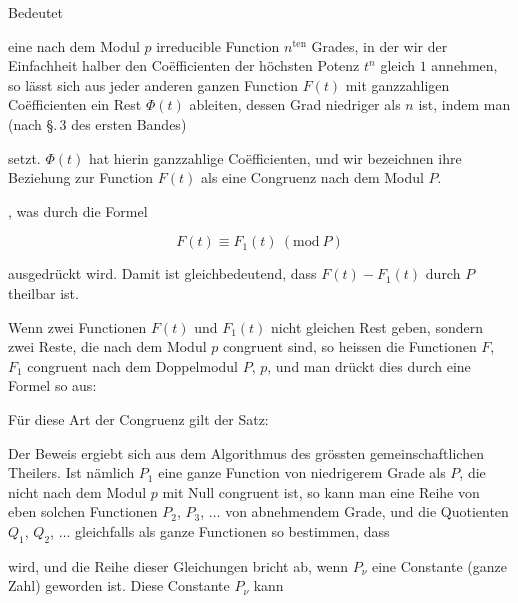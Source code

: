 Bedeutet


eine nach dem Modul $p$ irreducible Function $n^{\mathrm{ten}}$ Grades, in der wir der Einfachheit halber den Co\"efficienten der höchsten Potenz $t^n$ gleich $1$ annehmen, so lässt sich aus jeder anderen ganzen Function $F(t)$ mit ganzzahligen Co\"efficienten ein Rest $\Phi(t)$ ableiten, dessen Grad niedriger als $n$ ist, indem man (nach \S.\,3 des ersten Bandes)


setzt. $\Phi(t)$ hat hierin ganzzahlige Co\"efficienten, und wir bezeichnen ihre Beziehung zur Function $F(t)$ als eine Congruenz nach dem Modul $P$.

, was durch die Formel

\[
F(t) \equiv F_1(t)\ (\mathrm{mod}\ P)
\]

ausgedrückt wird. Damit ist gleichbedeutend, dass $F(t) - F_1(t)$ durch $P$ theilbar ist.

Wenn zwei Functionen $F(t)$ und $F_1(t)$ nicht gleichen Rest geben, sondern zwei Reste, die nach dem Modul $p$ congruent sind, so heissen die Functionen $F$, $F_1$ congruent nach dem Doppelmodul $P$, $p$, und man drückt dies durch eine Formel so aus:


Für diese Art der Congruenz gilt der Satz:


Der Beweis ergiebt sich aus dem Algorithmus des grössten gemeinschaftlichen Theilers. Ist nämlich $P_1$ eine ganze Function von niedrigerem Grade als $P$, die nicht nach dem Modul $p$ mit Null congruent ist, so kann man eine Reihe von eben solchen Functionen $P_2$, $P_3$, $\ldots$ von abnehmendem Grade, und die Quotienten $Q_1$, $Q_2$, $\ldots$ gleichfalls als ganze Functionen so bestimmen, dass


wird, und die Reihe dieser Gleichungen bricht ab, wenn $P_\nu$ eine Constante (ganze Zahl) geworden ist. Diese Constante $P_\nu$ kann
